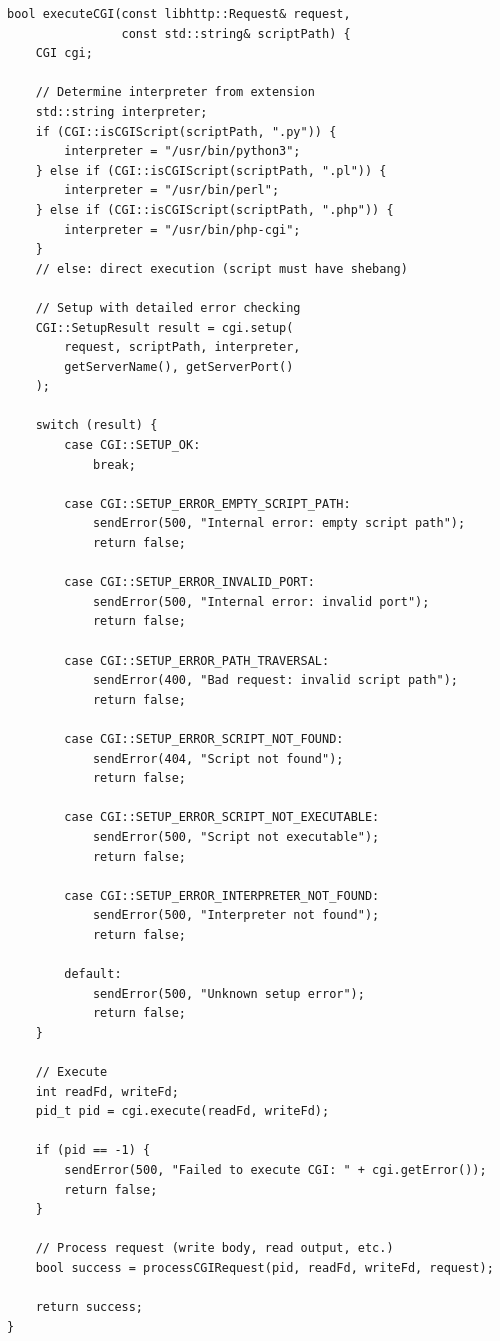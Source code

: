 \documentclass[11pt,a4paper]{article}
\begin{document}
\begin{lstlisting}[caption=Comprehensive Error Handling]
bool executeCGI(const libhttp::Request& request,
                const std::string& scriptPath) {
    CGI cgi;
    
    // Determine interpreter from extension
    std::string interpreter;
    if (CGI::isCGIScript(scriptPath, ".py")) {
        interpreter = "/usr/bin/python3";
    } else if (CGI::isCGIScript(scriptPath, ".pl")) {
        interpreter = "/usr/bin/perl";
    } else if (CGI::isCGIScript(scriptPath, ".php")) {
        interpreter = "/usr/bin/php-cgi";
    }
    // else: direct execution (script must have shebang)
    
    // Setup with detailed error checking
    CGI::SetupResult result = cgi.setup(
        request, scriptPath, interpreter,
        getServerName(), getServerPort()
    );
    
    switch (result) {
        case CGI::SETUP_OK:
            break;
            
        case CGI::SETUP_ERROR_EMPTY_SCRIPT_PATH:
            sendError(500, "Internal error: empty script path");
            return false;
            
        case CGI::SETUP_ERROR_INVALID_PORT:
            sendError(500, "Internal error: invalid port");
            return false;
            
        case CGI::SETUP_ERROR_PATH_TRAVERSAL:
            sendError(400, "Bad request: invalid script path");
            return false;
            
        case CGI::SETUP_ERROR_SCRIPT_NOT_FOUND:
            sendError(404, "Script not found");
            return false;
            
        case CGI::SETUP_ERROR_SCRIPT_NOT_EXECUTABLE:
            sendError(500, "Script not executable");
            return false;
            
        case CGI::SETUP_ERROR_INTERPRETER_NOT_FOUND:
            sendError(500, "Interpreter not found");
            return false;
            
        default:
            sendError(500, "Unknown setup error");
            return false;
    }
    
    // Execute
    int readFd, writeFd;
    pid_t pid = cgi.execute(readFd, writeFd);
    
    if (pid == -1) {
        sendError(500, "Failed to execute CGI: " + cgi.getError());
        return false;
    }
    
    // Process request (write body, read output, etc.)
    bool success = processCGIRequest(pid, readFd, writeFd, request);
    
    return success;
}
\end{lstlisting}
\end{document}
